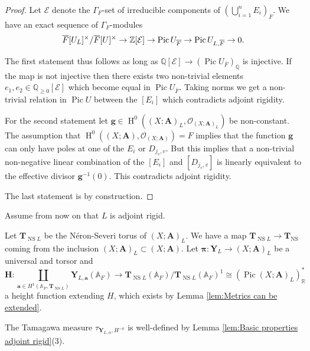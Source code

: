 \documentclass[a4paper,11pt,reqno]{amsart}
\newcommand{\Q}{\mathbb{Q}}
\newcommand{\R}{\mathbb{R}}
\newcommand{\A}{\mathbb{A}}
\DeclareMathOperator{\Pic}{Pic}
\DeclareMathOperator{\NS}{NS}
\DeclareMathOperator{\HH}{H}
\theoremstyle{definition}
\begin{document}
\begin{proof}
	Let $\mathcal{E}$ denote the $\Gamma_F$-set of irreducible components of $(\bigcup_{i = 1}^n E_i)_{\overline{F}}$. We have an exact sequence of $\Gamma_F$-modules
	\begin{equation}\label{eq:Exact sequence of adjoint rigid model}
		\overline{F}[U_L]^{\times}/\overline{F}[U]^{\times} \to \Z[\mathcal{E}] \to \Pic U_{\overline{F}} \to \Pic U_{L, \overline{F}} \to 0.
	\end{equation}
	
	The first statement thus follows as long as $\Q[\mathcal{E}] \to (\Pic U_{\overline{F}})_{\Q}$ is injective. If the map is not injective then there exists two non-trivial elements $e_1, e_2 \in \Q_{\geq 0}[\mathcal{E}]$ which become equal in $\Pic U_{\overline{F}}$. Taking norms we get a non-trivial relation in $\Pic U$ between the $[E_i]$ which contradicts adjoint rigidity.
	
	For the second statement let $\mathbf{g} \in \HH^0((X ; \mathbf{A})_L, \mathcal{O}_{(X ; \mathbf{A})_L})$ be non-constant. The assumption that $\HH^0((X ; \mathbf{A}), \mathcal{O}_{(X ; \mathbf{A})}) = F$ implies that the function $\mathbf{g}$ can only have poles at one of the $E_i$ or $D_{j_v, v}$. But this implies that a non-trivial non-negative linear combination of the $[E_i]$ and $[D_{j_v, v}]$ is linearly equivalent to the effective divisor $\mathbf{g}^{-1}(0)$. This contradicts adjoint rigidity.
	
	The last statement is by construction.
\end{proof}

Assume from now on that $L$ is adjoint rigid.

Let $\mathbf{T}_{\NS L}$ be the N\'eron-Severi torus of $(X ; \mathbf{A})_L$. We have a map $\mathbf{T}_{\NS L} \to \mathbf{T}_{\NS}$ coming from the inclusion $(X ; \mathbf{A})_L \subset (X ; \mathbf{A})$. Let $\bm{\pi}: \mathbf{Y}_L \to (X ; \mathbf{A})_L$ be a universal and torsor and 
\[
\mathbf{H}: \coprod_{\mathbf{a} \in H^1(\A_F, \mathbf{T}_{\NS L})} \mathbf{Y}_{L, \mathbf{a}}(\A_F) \to \mathbf{T}_{\NS L}(\A_F)/\mathbf{T}_{\NS L}(\A_F)^1 \cong (\Pic (X ; \mathbf{A})_L)_{\R}^*
\]
a height function extending $H$, which exists by Lemma \ref{lem:Metrics can be extended}.

The Tamagawa measure $\tau_{\mathbf{Y}_{L, \alpha}, H^{-a}}$ is well-defined by Lemma \ref{lem:Basic properties adjoint rigid}(3).
\end{document}
